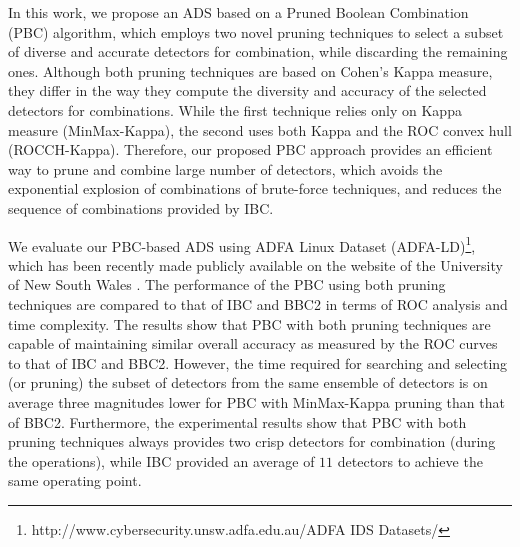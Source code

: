In this work, we propose an ADS based on a Pruned Boolean Combination (PBC) algorithm, which employs two novel pruning techniques to select a subset of diverse and accurate detectors for combination, while discarding the remaining ones.
Although both pruning techniques are based on Cohen's Kappa \cite{Cohen1995a} measure, they differ in the way they compute the diversity and accuracy of the selected detectors for combinations.
While the first technique relies only on Kappa measure (MinMax-Kappa), the second uses both Kappa and the ROC convex hull (ROCCH-Kappa).
Therefore, our proposed PBC approach provides an efficient way to prune and combine large number of detectors, which avoids the exponential explosion of combinations of brute-force techniques, and reduces the sequence of combinations provided by IBC.

We evaluate our PBC-based ADS using ADFA Linux Dataset (ADFA-LD)\footnote{http://www.cybersecurity.unsw.adfa.edu.au/ADFA IDS Datasets/}, which has been recently made publicly available on the website of the University of New South Wales \cite{Creech2013a}.
The performance of the PBC using both pruning techniques are compared to that of IBC and BBC2 in terms of ROC analysis and time complexity.
The results show that PBC with both pruning techniques are capable of maintaining similar overall accuracy as measured by the ROC curves to that of IBC and BBC2.
However, the time required for searching and selecting (or pruning) the subset of detectors from the same ensemble of detectors is on average three magnitudes lower for PBC with MinMax-Kappa pruning than that of BBC2.
Furthermore, the experimental results show that PBC with both pruning techniques always provides two crisp detectors for combination (during the operations), while IBC provided an average of $11$ detectors to achieve the same operating point.


